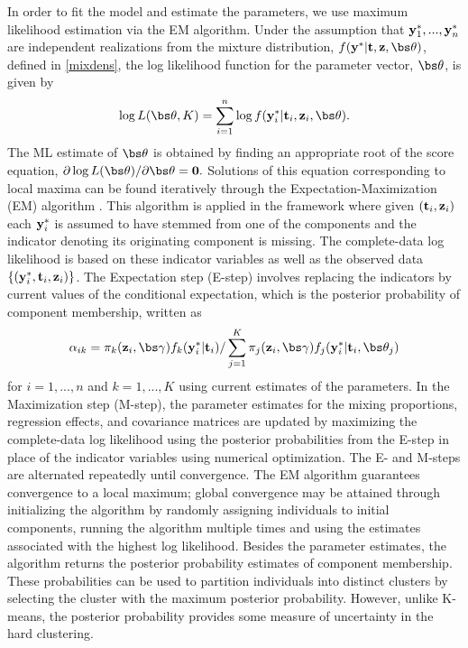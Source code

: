 In order to fit the model and estimate the parameters, we use maximum likelihood estimation via the EM algorithm. Under the assumption that $\mathbf y^{*}_{1},...,\mathbf y^{*}_{n}$ are independent realizations from the mixture distribution, $f(\B y^{*} | \B t, \B z, \bs\theta)$, defined in \ref{mixdens}, the log likelihood function for the parameter vector, $\bs \theta$, is given by
$$\log L(\bs\theta,K)=\sum^{n}_{i=1}\log f(\B y^{*}_{i}|\B t_{i},\B z_{i},\bs \theta).$$
The ML estimate of $\bs\theta$ is obtained by finding an appropriate root of the score equation, $\partial \log L(\bs\theta)/\partial \bs\theta=\B 0.$ Solutions of this equation corresponding to local maxima can be found iteratively through the Expectation-Maximization (EM) algorithm \cite{dempster1977}. This algorithm is applied in the framework where given $(\mathbf t_{i},\mathbf z_{i})$ each $\mathbf y^{*}_{i}$ is assumed to have stemmed from one of the components and the indicator denoting its originating component is missing. The complete-data log likelihood is based on these indicator variables as well as the observed data $\{(\mathbf y^{*}_{i}, \mathbf t_{i}, \mathbf z_{i})\}$. The Expectation step (E-step) involves replacing the indicators by current values of the conditional expectation, which is the posterior probability of component membership, written as
$$\alpha_{ik}=\pi_{k}(\B z_{i},\bs\gamma)f_{k}(\B y^{*}_{i}|\B t_{i})/\sum_{j=1}^{K}\pi_{j}(\B z_{i},\bs\gamma)f_{j}(\B y^{*}_{i}|\B t_{i},\bs \theta_{j})$$
for $i=1,...,n$ and $k=1,...,K$ using current estimates of the parameters. In the Maximization step (M-step), the parameter estimates for the mixing proportions, regression effects, and covariance matrices are updated by maximizing the complete-data log likelihood using the posterior probabilities from the E-step in place of the indicator variables using numerical optimization. The E- and M-steps are alternated repeatedly until convergence. The EM algorithm guarantees convergence to a local maximum; global convergence may be attained through initializing the algorithm by randomly assigning individuals to initial components, running the algorithm multiple times and using the estimates associated with the highest log likelihood. Besides the parameter estimates, the algorithm returns the posterior probability estimates of component membership. These probabilities can be used to partition individuals into distinct clusters by selecting the cluster with the maximum posterior probability. However, unlike K-means, the posterior probability provides some measure of uncertainty in the hard clustering. 

